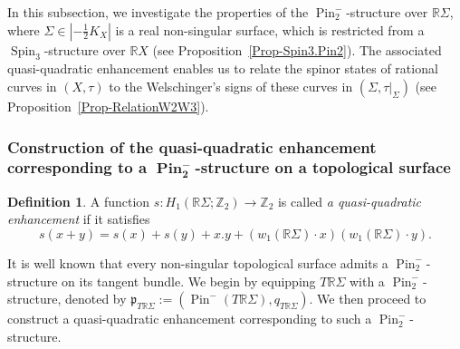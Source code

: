 \documentclass[11pt]{amsart}
\numberwithin{equation}{section}
\theoremstyle{definition}
\newtheorem{definition}{Definition}[section]
\theoremstyle{plain}
\theoremstyle{remark}
\newcommand{\R}{\mathbb{R}}
\newcommand{\Z}{\mathbb{Z}}
\DeclareMathOperator{\Pin}{Pin}
\DeclareMathOperator{\Spin}{Spin}
\begin{document}
In this subsection, we investigate the properties of the $\Pin_2^-$-structure over $\R \Sigma$, where $\Sigma\in |-\frac{1}{2}K_X|$ is a real non-singular surface, which is restricted from a $\Spin_3$-structure over $\R X$  (see Proposition~\ref{Prop-Spin3.Pin2}). The associated quasi-quadratic enhancement enables us to relate the spinor states of rational curves in $(X,\tau)$ to the Welschinger's signs of these curves in  $(\Sigma,\tau|_\Sigma)$ (see Proposition~\ref{Prop-RelationW2W3}).

\subsubsection{Construction of the quasi-quadratic enhancement corresponding to a $\boldsymbol{\Pin^-_2}$-structure on a  topological surface}\label{subsect-construction_quasiquad_enhancement}

\begin{definition} \label{def-quasiquadratic.enhancement}
  A function $s\colon  H_1(\R \Sigma;\Z_2) \to \Z_2$ is called \emph{a quasi-quadratic enhancement} if it satisfies
  $$s(x+y)=s(x)+s(y)+x.y+(w_1(\R \Sigma)\cdot x)(w_1(\R \Sigma)\cdot y).$$
\end{definition}

It is well known that every non-singular topological surface admits a $\Pin_2^-$-structure on its tangent bundle. We begin by equipping  $T\R \Sigma$ with a $\Pin_2^-$-structure, denoted by $\mathfrak{p}_{T\R \Sigma}:=(\Pin^-(T\R \Sigma),q_{T\R \Sigma})$.  We then proceed to construct a quasi-quadratic enhancement corresponding to such a $\Pin^-_2$-structure.
\end{document}
